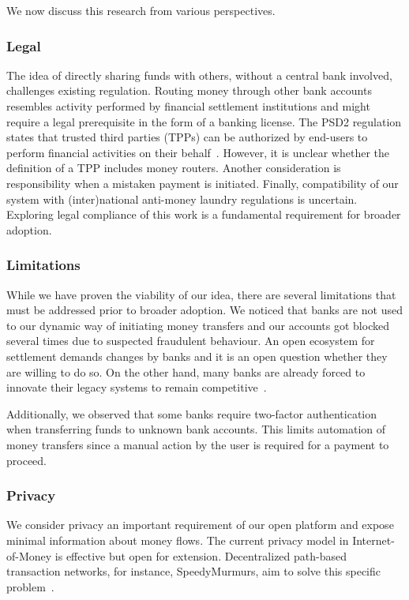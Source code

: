 We now discuss this research from various perspectives.

\subsubsection*{Legal}
The idea of directly sharing funds with others, without a central bank involved, challenges existing regulation.
Routing money through other bank accounts resembles activity performed by financial settlement institutions and might require a legal prerequisite in the form of a banking license.
The PSD2 regulation states that trusted third parties (TPPs) can be authorized by end-users to perform financial activities on their behalf~\cite{cortet2016psd2}.
However, it is unclear whether the definition of a TPP includes money routers.
Another consideration is responsibility when a mistaken payment is initiated.
Finally, compatibility of our system with (inter)national anti-money laundry regulations is uncertain.
Exploring legal compliance of this work is a fundamental requirement for broader adoption.

\subsubsection*{Limitations}
While we have proven the viability of our idea, there are several limitations that must be addressed prior to broader adoption.
We noticed that banks are not used to our dynamic way of initiating money transfers and our accounts got blocked several times due to suspected fraudulent behaviour.
An open ecosystem for settlement demands changes by banks and it is an open question whether they are willing to do so.
On the other hand, many banks are already forced to innovate their legacy systems to remain competitive~\cite{mckinsey2016payments}.

Additionally, we observed that some banks require two-factor authentication when transferring funds to unknown bank accounts.
This limits automation of money transfers since a manual action by the user is required for a payment to proceed.

\subsubsection*{Privacy}
We consider privacy an important requirement of our open platform and expose minimal information about money flows.
The current privacy model in Internet-of-Money is effective but open for extension.
Decentralized path-based transaction networks, for instance, SpeedyMurmurs, aim to solve this specific problem~\cite{roos2017settling}.


